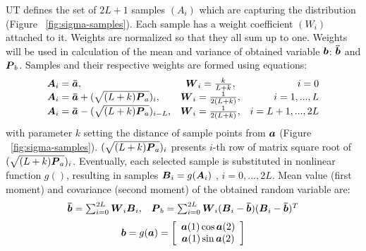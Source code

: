 UT defines the set of $2L+1$ samples $(A_{i})$ which are capturing the distribution (Figure ~\ref{fig:sigma-samples}). Each sample has a weight coefficient $(W_{i})$ attached to it. Weights are normalized so that they all sum up to one. Weights will be used in calculation of the mean and variance of obtained variable $\boldsymbol{b}$: $\boldsymbol{\bar{b}}$ and $\boldsymbol{P}_{b}$. Samples and their respective weights are formed using equations:
\begin{eqnarray}
\begin{array}{l c r}
\boldsymbol{A}_{i} = \boldsymbol{\bar{a}}, & \boldsymbol{W}_{i} = \frac{k}{L+k}, & i = 0 \\
\boldsymbol{A}_{i} = \boldsymbol{\bar{a}}+(\sqrt{(L+k)\boldsymbol{P}_{a}})_{i}, & \boldsymbol{W}_{i} = \frac{1}{2(L+k)}, & i = 1,...,L \\
\boldsymbol{A}_{i} = \boldsymbol{\bar{a}}-(\sqrt{(L+k)\boldsymbol{P}_{a}})_{i-L}, & \boldsymbol{W}_{i} = \frac{1}{2(L+k)}, & i = L+1,...,2L \\
\end{array}
\label{eq:ut-sampling}
\end{eqnarray}
with parameter $k$ setting the distance of sample points from $\boldsymbol{a}$ (Figure ~\ref{fig:sigma-samples}). $(\sqrt{(L+k)\boldsymbol{P}_{a}})_{i}$ presents $i$-th row of matrix square root of $(\sqrt{(L+k)\boldsymbol{P}_{a}})_{i}$. Eventually, each selected sample is substituted in nonlinear function $g()$, resulting in samples $\boldsymbol{B}_{i} = g(\boldsymbol{A}_{i})$ , $i = 0 ,..., 2L$. Mean value (first moment) and covariance (second moment) of the obtained random variable are:
\begin{equation}
\begin{array}{l r}
\boldsymbol{\bar{b}} = \sum_{i=0}^{2L} \boldsymbol{W}_{i} \boldsymbol{B}_{i},   &
\boldsymbol{P}_{b} = \sum_{i=0}^{2L} \boldsymbol{W}_{i} (\boldsymbol{B}_{i} - \boldsymbol{\bar{b}}) (\boldsymbol{B}_{i} - \boldsymbol{\bar{b}})^{T}
\end{array}
\label{eq:ut-estimate}
\end{equation}
\begin{equation}
\boldsymbol{b} = g(\boldsymbol{a}) = \left[ \begin{array}{c} \boldsymbol{a}(1) \cos \boldsymbol{a}(2) \\ \boldsymbol{a}(1) \sin \boldsymbol{a}(2) \end{array} \right]
\label{eq:2cart}
\end{equation}

